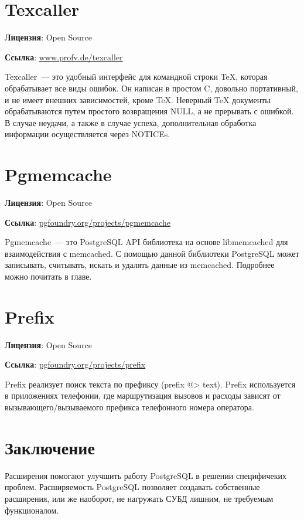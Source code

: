 \section{Texcaller}
\textbf{Лицензия}: Open Source

\textbf{Ссылка}: \href{http://www.profv.de/texcaller/}{www.profv.de/texcaller}

Texcaller~--- это удобный интерфейс для командной строки TeX, которая обрабатывает все виды ошибок. Он написан в простом C, довольно портативный, 
и не имеет внешних зависимостей, кроме TeX. Неверный TeX документы обрабатываются путем простого возвращения NULL, 
а не прерывать с ошибкой. В случае неудачи, а также в случае успеха, дополнительная обработка информации осуществляется через NOTICEs.

\section{Pgmemcache}
\textbf{Лицензия}: Open Source

\textbf{Ссылка}: \href{http://pgfoundry.org/projects/pgmemcache/}{pgfoundry.org/projects/pgmemcache}

Pgmemcache~--- это PostgreSQL API библиотека на основе libmemcached для взаимодействия с memcached. С помощью данной библиотеки 
PostgreSQL может записывать, считывать, искать и удалять данные из memcached. Подробнее можно почитать в  главе.

\section{Prefix}
\textbf{Лицензия}: Open Source

\textbf{Ссылка}: \href{http://pgfoundry.org/projects/prefix}{pgfoundry.org/projects/prefix}

Prefix реализует поиск текста по префиксу (prefix @> text). 
Prefix используется в приложениях телефонии, где маршрутизация вызовов и расходы зависят от вызывающего/вызываемого префикса телефонного номера оператора.



\section{Заключение}
Расширения помогают улучшить работу PostgreSQL в решении специфичеких проблем. Расширяемость PostgreSQL позволяет создавать собственные расширения, 
или же наоборот, не нагружать СУБД лишним, не требуемым функционалом.